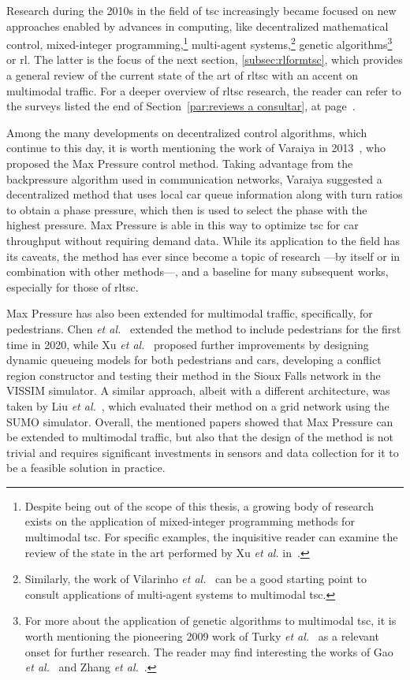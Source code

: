 \noindent Research during the 2010s in the field of \gls{tsc} increasingly became focused on new approaches enabled by advances in computing, like decentralized mathematical control, mixed-integer programming,\footnote{
  Despite being out of the scope of this thesis, a growing body of research exists on the application of mixed-integer programming methods for multimodal \gls{tsc}. For specific examples, the inquisitive reader can examine the review of the state in the art performed by Xu \textit{et al.} in~\cite{Xu2024}.
  }
multi-agent systems,\footnote{
  Similarly, the work of Vilarinho \textit{et al.}~\cite{Vilarinho2017} can be a good starting point to consult applications of multi-agent systems to multimodal \gls{tsc}.
  }
genetic algorithms\footnote{
  For more about the application of genetic algorithms to multimodal \gls{tsc}, it is worth mentioning the pioneering 2009 work of Turky \textit{et al.}~\cite{Turky2009} as a relevant onset for further research. The reader may find interesting the works of Gao \textit{et al.}~\cite{Gao2021} and Zhang \textit{et al.}~\cite{Zhang2021}.
  }
or \acrfull{rl}. The latter is the focus of the next section, \ref{subsec:rlformtsc}, which provides a general review of the current state of the art of \gls{rltsc} with an accent on multimodal traffic. For a deeper overview of \gls{rltsc} research, the reader can refer to the surveys listed the end of Section~\ref{par:reviews a consultar}, at page~\pageref{par:reviews a consultar}.

\label{par:maxpressure}
Among the many developments on decentralized control algorithms, which continue to this day, it is worth mentioning the work of Varaiya in 2013~\cite{Varaiya2013}, who proposed the Max Pressure control method. Taking advantage from the backpressure algorithm used in communication networks, Varaiya suggested a decentralized method that uses local car queue information along with turn ratios to obtain a phase pressure, which then is used to select the phase with the highest pressure. Max Pressure is able in this way to optimize \gls{tsc} for car throughput without requiring demand data. While its application to the field has its caveats, the method has ever since become a topic of research —by itself or in combination with other methods—, and a baseline for many subsequent works, especially for those of \gls{rltsc}.

Max Pressure has also been extended for multimodal traffic, specifically, for pedestrians. Chen \textit{et al.}~\cite{Chen2020b} extended the method to include pedestrians for the first time in 2020, while Xu \textit{et al.}~\cite{Xu2024} proposed further improvements by designing dynamic queueing models for both pedestrians and cars, developing a conflict region constructor and testing their method in the Sioux Falls network in the VISSIM simulator. A similar approach, albeit with a different architecture, was taken by Liu \textit{et al.}~\cite{Liu2024}, which evaluated their method on a grid network using the SUMO simulator. Overall, the mentioned papers showed that Max Pressure can be extended to multimodal traffic, but also that the design of the method is not trivial and requires significant investments in sensors and data collection for it to be a feasible solution in practice.

